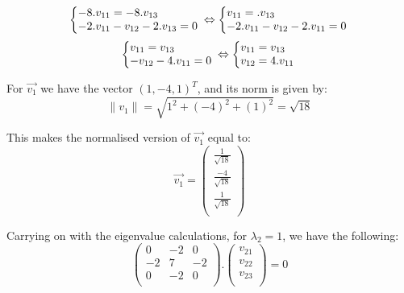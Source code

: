 \documentclass[a4,12pt,twosided,openany]{memoir}
\begin{document}
\[
  \left\{\begin{array}{@{}l@{}}
   -8.v_{11} = -8.v_{13}\\
   -2.v_{11} -v_{12}-2.v_{13} = 0\\
  \end{array}\right.\,
   \Leftrightarrow
  \left\{\begin{array}{@{}l@{}}
   v_{11} = .v_{13}\\
  -2.v_{11} -v_{12}-2.v_{11} = 0\\
  \end{array}\right.\,
\]
\[
  \left\{\begin{array}{@{}l@{}}
  v_{11} = v_{13}\\   
  -v_{12}-4.v_{11} = 0\\
  \end{array}\right.\,
   \Leftrightarrow
  \left\{\begin{array}{@{}l@{}}
  v_{11} = v_{13}\\   
  v_{12}=4.v_{11} \\
  \end{array}\right.\,
\]
\par 
\indent
For $\overrightarrow{v_1}$ we have the vector $(
1,-4,1 )^T$, and its norm is given by: 
\[\| v_1 \| = \sqrt{1^2 + (-4)^2 + (1)^2} = \sqrt{18}\]
\par 
\indent
This makes the normalised version of $\overrightarrow{v_1}$ equal to:
\[
\overrightarrow{v_1} = \begin{pmatrix}
\frac{1}{\sqrt{18}} \\
\frac{-4}{\sqrt{18}} \\
\frac{1}{\sqrt{18}} \\
\end{pmatrix}
\]
\par 
\indent
Carrying on with the eigenvalue calculations, for $\lambda_2 = 1$, we have the following:
\[
\begin{pmatrix}
0 & -2 & 0 \\
-2 & 7 & -2 \\
0 & -2 & 0 \\
\end{pmatrix}.
\begin{pmatrix}
v_{21}\\
v_{22}\\
v_{23} \\
\end{pmatrix} = 0 
\]
\end{document}
